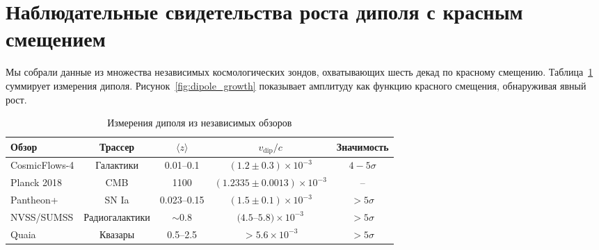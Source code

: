 \documentclass[11pt,a4paper]{article}
\begin{document}
	\section{Наблюдательные свидетельства роста диполя с красным смещением}
	
	Мы собрали данные из множества независимых космологических зондов, охватывающих шесть декад по красному смещению. Таблица~\ref{tab:dipoles} суммирует измерения диполя. Рисунок~\ref{fig:dipole_growth} показывает амплитуду как функцию красного смещения, обнаруживая явный рост.
	
	\begin{table}[htbp]
		\centering
		\caption{Измерения диполя из независимых обзоров}
		\label{tab:dipoles}
		\begin{tabular}{lcccc}
			\toprule
			\textbf{Обзор} & \textbf{Трассер} & \(\langle z \rangle\) & \(v_{\text{dip}}/c\) & \textbf{Значимость} \\
			\midrule
			CosmicFlows-4 \cite{Watkins2023} & Галактики & 0.01--0.1 & \((1.2 \pm 0.3) \times 10^{-3}\) & \(4-5\sigma\) \\
			Planck 2018 \cite{Planck2018VII} & CMB & 1100 & \((1.2335 \pm 0.0013) \times 10^{-3}\) & -- \\
			Pantheon+ \cite{Sah2025} & SN Ia & 0.023--0.15 & \((1.5 \pm 0.1) \times 10^{-3}\) & \(>5\sigma\) \\
			NVSS/SUMSS \cite{Colin2017} & Радиогалактики & \(\sim0.8\) & \((4.5\)--\(5.8) \times 10^{-3}\) & \(>5\sigma\) \\
			Quaia \cite{Secrest2025} & Квазары & 0.5--2.5 & \(>5.6 \times 10^{-3}\) & \(>5\sigma\) \\
			\bottomrule
		\end{tabular}
	\end{table}
	
\end{document}
